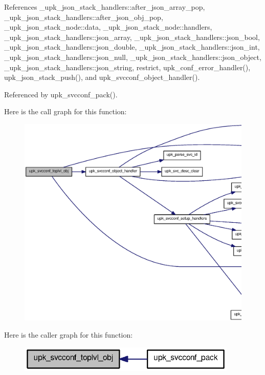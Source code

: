 References \_\-upk\_\-json\_\-stack\_\-handlers::after\_\-json\_\-array\_\-pop, \_\-upk\_\-json\_\-stack\_\-handlers::after\_\-json\_\-obj\_\-pop, \_\-upk\_\-json\_\-stack\_\-node::data, \_\-upk\_\-json\_\-stack\_\-node::handlers, \_\-upk\_\-json\_\-stack\_\-handlers::json\_\-array, \_\-upk\_\-json\_\-stack\_\-handlers::json\_\-bool, \_\-upk\_\-json\_\-stack\_\-handlers::json\_\-double, \_\-upk\_\-json\_\-stack\_\-handlers::json\_\-int, \_\-upk\_\-json\_\-stack\_\-handlers::json\_\-null, \_\-upk\_\-json\_\-stack\_\-handlers::json\_\-object, \_\-upk\_\-json\_\-stack\_\-handlers::json\_\-string, restrict, upk\_\-conf\_\-error\_\-handler(), upk\_\-json\_\-stack\_\-push(), and upk\_\-svcconf\_\-object\_\-handler().



Referenced by upk\_\-svcconf\_\-pack().



Here is the call graph for this function:
\nopagebreak
\begin{figure}[H]
\begin{center}
\leavevmode
\includegraphics[width=400pt]{group__config__impl_ga79e7ae10de877eae2a7c297af5e3a2e1_cgraph}
\end{center}
\end{figure}




Here is the caller graph for this function:
\nopagebreak
\begin{figure}[H]
\begin{center}
\leavevmode
\includegraphics[width=296pt]{group__config__impl_ga79e7ae10de877eae2a7c297af5e3a2e1_icgraph}
\end{center}
\end{figure}


